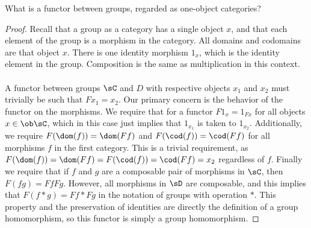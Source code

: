 \documentclass[main.tex]{subfiles}
\begin{document}
\begin{exercise}
	What is a functor between groups, regarded as one-object categories?
\end{exercise}

\begin{proof}
	Recall that a group as a category has a single object \(x\), and that each
	element of the group is a morphism in the category.  All domains and
	codomains are that object \(x\).  There is one identity morphism \(1_x\),
	which is the identity element in the group.  Composition is the same as
	multiplication in this context. \\ \\ A functor between groups \(\sC\) and
	\(D\) with respective objects \(x_1\) and \(x_2\) must trivially be such
	that \(Fx_1 = x_2\).  Our primary concern is the behavior of the functor
	on the morphisms. We require that for a functor \(F1_x = 1_{Fx}\) for
	all objects \(x \in \ob\sC\), which in this case just implies that \(1_{x_1}\)
	is taken to \(1_{x_2}\).  Additionally, we require \(F(\dom(f)) =
	\dom(Ff)\) and \(F(\cod(f)) = \cod(Ff)\) for all morphisms \(f\) in the
	first category.  This is a trivial requirement, as \(F(\dom(f)) = \dom(Ff)
	= F(\cod(f))= \cod(Ff) = x_2\) regardless of \(f\).  Finally we require
	that if \(f\) and \(g\) are a composable pair of morphisms in \(\sC\), then
	\(F(fg) = FfFg\). However, all morphisms in \(\sD\) are composable, and
	this implies that \(F(f*g) = Ff*Fg\) in the notation of groups with
	operation \(*\).  This property and the preservation of identities are
	directly the definition of a group homomorphism, so this functor is simply a
	group homomorphism.
\end{proof}
\end{document}
